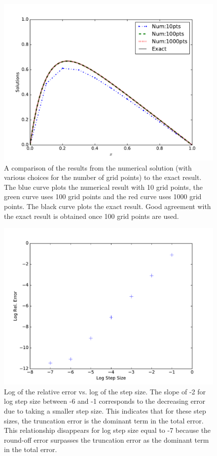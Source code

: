 \documentclass[10pt,showpacs,preprintnumbers,footinbib,amsmath,amssymb,aps,prl,twocolumn,groupedaddress,superscriptaddress,showkeys]{revtex4-1}
\begin{document}
\begin{figure}
\centering
	\includegraphics{figures/sols.pdf}
	\caption{A comparison of the results from the numerical solution
	(with various choices for the number of grid points) to the exact
	result. The blue curve plots the numerical result with 10 grid
	points, the green curve uses 100 grid points and the red curve
	uses 1000 grid points. The black curve plots the exact result.
	Good agreement with the exact result is obtained once 100 grid
	points are used.}
	\label{fig:compexact}
\end{figure}

\begin{figure}
\centering
	\includegraphics{figures/rerr.pdf}
	\caption{Log of the relative error vs. log of the step size.
	The slope of -2 for log step size between -6 and -1 corresponds
	to the decreasing error due to taking a smaller step size. This
	indicates that for these step sizes, the truncation error is
	the dominant term in the total error. This relationship disappears
	for log step size equal to -7 because the round-off error surpasses
	the truncation error as the dominant term in the total error.}
	\label{fig:rerr}
\end{figure}
\end{document}
